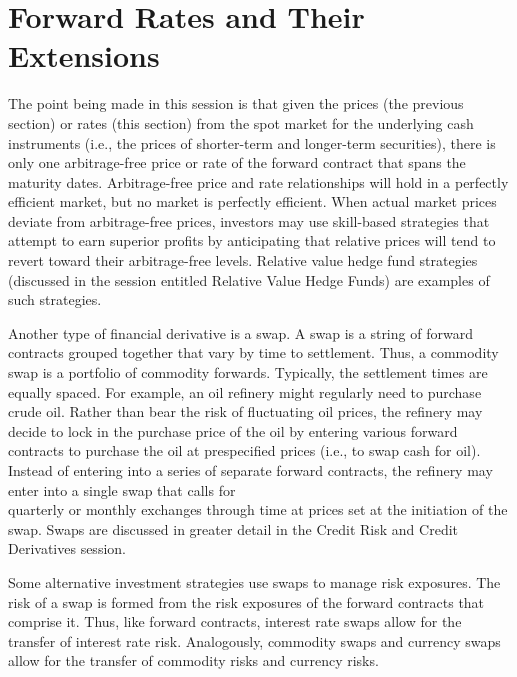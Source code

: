 \documentclass[11pt]{article}
\begin{document}
\section*{Forward Rates and Their Extensions}
The point being made in this session is that given the prices (the previous section) or rates (this section) from the spot market for the underlying cash instruments (i.e., the prices of shorter-term and longer-term securities), there is only one arbitrage-free price or rate of the forward contract that spans the maturity dates. Arbitrage-free price and rate relationships will hold in a perfectly efficient market, but no market is perfectly efficient. When actual market prices deviate from arbitrage-free prices, investors may use skill-based strategies that attempt to earn superior profits by anticipating that relative prices will tend to revert toward their arbitrage-free levels. Relative value hedge fund strategies (discussed in the session entitled Relative Value Hedge Funds) are examples of such strategies.

Another type of financial derivative is a swap. A swap is a string of forward contracts grouped together that vary by time to settlement. Thus, a commodity swap is a portfolio of commodity forwards. Typically, the settlement times are equally spaced. For example, an oil refinery might regularly need to purchase crude oil. Rather than bear the risk of fluctuating oil prices, the refinery may decide to lock in the purchase price of the oil by entering various forward contracts to purchase the oil at prespecified prices (i.e., to swap cash for oil). Instead of entering into a series of separate forward contracts, the refinery may enter into a single swap that calls for\\
quarterly or monthly exchanges through time at prices set at the initiation of the swap. Swaps are discussed in greater detail in the Credit Risk and Credit Derivatives session.

Some alternative investment strategies use swaps to manage risk exposures. The risk of a swap is formed from the risk exposures of the forward contracts that comprise it. Thus, like forward contracts, interest rate swaps allow for the transfer of interest rate risk. Analogously, commodity swaps and currency swaps allow for the transfer of commodity risks and currency risks.
\end{document}
